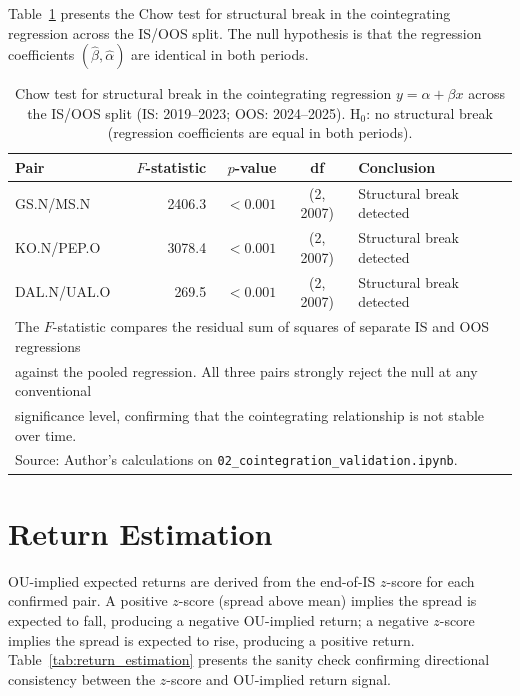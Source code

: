 \documentclass[a4paper]{report}
\begin{document}
Table~\ref{tab:chow_results} presents the Chow test for structural break in the cointegrating
regression across the IS/OOS split. The null hypothesis is that the regression coefficients
$(\hat{\beta}, \hat{\alpha})$ are identical in both periods.

\begin{table}[htbp]
\centering
\caption{Chow test for structural break in the cointegrating regression $y = \alpha + \beta x$
across the IS/OOS split (IS: 2019--2023; OOS: 2024--2025).
H$_0$: no structural break (regression coefficients are equal in both periods).}
\label{tab:chow_results}
\begin{tabular}{lrrcl}
\toprule
Pair & $F$-statistic & $p$-value & df & Conclusion \\
\midrule
GS.N/MS.N   & 2406.3 & $<0.001$ & (2, 2007) & Structural break detected \\
KO.N/PEP.O  & 3078.4 & $<0.001$ & (2, 2007) & Structural break detected \\
DAL.N/UAL.O &  269.5 & $<0.001$ & (2, 2007) & Structural break detected \\
\bottomrule
\multicolumn{5}{l}{\small The $F$-statistic compares the residual sum of squares of separate IS and OOS regressions} \\
\multicolumn{5}{l}{\small against the pooled regression. All three pairs strongly reject the null at any conventional} \\
\multicolumn{5}{l}{\small significance level, confirming that the cointegrating relationship is not stable over time.} \\
\multicolumn{5}{l}{\small Source: Author's calculations on \texttt{02\_cointegration\_validation.ipynb}.}
\end{tabular}
\end{table}

\FloatBarrier

\section{Return Estimation}

OU-implied expected returns are derived from the end-of-IS $z$-score for each
confirmed pair. A positive $z$-score (spread above mean) implies the spread is
expected to fall, producing a negative OU-implied return; a negative $z$-score
implies the spread is expected to rise, producing a positive return.
Table~\ref{tab:return_estimation} presents the sanity check confirming directional
consistency between the $z$-score and OU-implied return signal.
\end{document}
